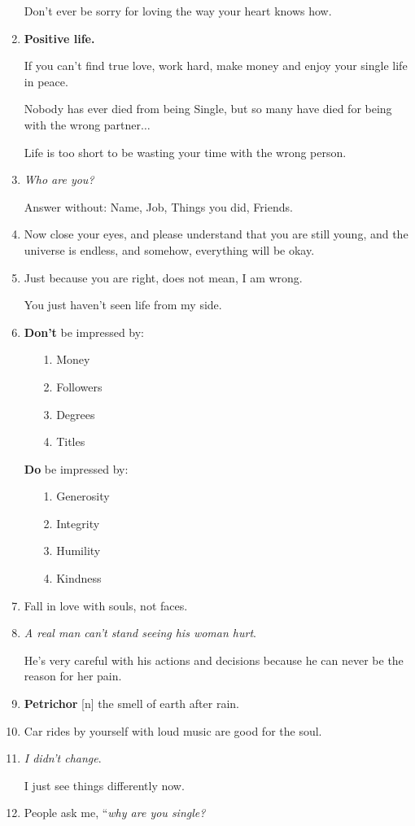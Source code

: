 \documentclass{article}
\begin{document}
\begin{enumerate}
	Don't ever be sorry for loving the way your heart knows how.
	\item \textbf{Positive life.}
	
	If you can't find true love, work hard, make money and enjoy your single life in peace.
	
	Nobody has ever died from being Single, but so many have died for being with the wrong partner$\ldots$
	
	Life is too short to be wasting your time with the wrong person.
	\item \textit{Who are you?}
	
	Answer without: Name, Job, Things you did, Friends.
	\item Now close your eyes, and please understand that you are still young, and the universe is endless, and somehow, everything will be okay.
	\item Just because you are right, does not mean, I am wrong.
	
	You just haven't seen life from my side.
	\item \textbf{Don't} be impressed by:
	\begin{itemize}
		\item[1.] Money
		\item[2.] Followers
		\item[3.] Degrees
		\item[4.] Titles
	\end{itemize}
	\textbf{Do} be impressed by:
	\begin{itemize}
		\item[1.] Generosity
		\item[2.] Integrity
		\item[3.] Humility
		\item[4.] Kindness
	\end{itemize}
	\item Fall in love with souls, not faces.
	\item \textit{A real man can't stand seeing his woman hurt}.
	
	He's very careful with his actions and decisions because he can never be the reason for her pain.
	\item \textbf{Petrichor} [n] the smell of earth after rain.
	\item Car rides by yourself with loud music are good for the soul.
	\item \textit{I didn't change}.
	
	I just see things differently now.
	\item People ask me, ``\textit{why are you single?}
	

\end{enumerate}
\end{document}
